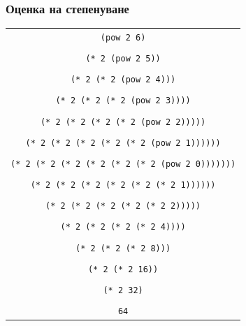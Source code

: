 \documentclass[alsotrans]{beamerswitch}
\begin{document}
\begin{frame}
  \frametitle{Оценка на степенуване}

  \begin{center}
    \tiny
    \begin{tabular}{c}
      \tt{(pow 2 6)}\\
      \nxt{\bda\\
      \tt{(* 2 (pow 2 5))}\\
      \nxt{\bda\\
      \tt{(* 2 (* 2 (pow 2 4)))}\\
      \nxt{\bda\\
      \tt{(* 2 (* 2 (* 2 (pow 2 3))))}\\
      \nxt{\bda\\
      \tt{(* 2 (* 2 (* 2 (* 2 (pow 2 2)))))}\\
      \nxt{\bda\\
      \tt{(* 2 (* 2 (* 2 (* 2 (* 2 (pow 2 1))))))}\\
      \nxt{\bda\\
      \tt{(* 2 (* 2 (* 2 (* 2 (* 2 (* 2 (pow 2 0)))))))}\\
      \nxt{\bda\\
      \tt{(* 2 (* 2 (* 2 (* 2 (* 2 (* 2 1))))))}\\
      \nxt{\bda\\
      \tt{(* 2 (* 2 (* 2 (* 2 (* 2 2)))))}\\
      \nxt{\bda\\
      \tt{(* 2 (* 2 (* 2 (* 2 4))))}\\
      \nxt{\bda\\
      \tt{(* 2 (* 2 (* 2 8)))}\\
      \nxt{\bda\\
      \tt{(* 2 (* 2 16))}\\
      \nxt{\bda\\
      \tt{(* 2 32)}\\
      \nxt{\bda\\
      \tt{64}}}}}}}}}}}}}}
    \end{tabular}
  \end{center}\ \\
\end{frame}
\end{document}
